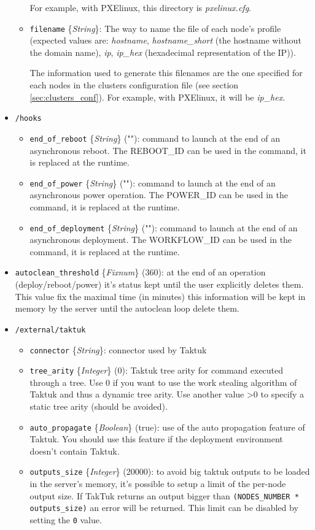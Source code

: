 \documentclass[a4wide,10pt,oneside]{book}
\newcommand{\ypath}[1]{\texttt{#1}}
\newcommand{\yfield}[2]{\texttt{#1} {\small\{{\emph{#2}}\}}:}
\newcommand{\yfieldd}[3]{\texttt{#1} {\small\{{\emph{#2}}\}} {\small(}#3{\small)}:}
\begin{document}
\begin{itemize}
\begin{itemize}
For example, with PXElinux, this directory is \emph{pxelinux.cfg}.
    \item \yfield{filename}{String} The way to name the file of each node's profile (expected values are: \emph{hostname}, \emph{hostname\_short} (the hostname without the domain name), \emph{ip}, \emph{ip\_hex} (hexadecimal representation of the IP)).

The information used to generate this filenames are the one specified for each nodes in the clusters configuration file (see section \ref{sec:clusters_conf}). For example, with PXElinux, it will be \emph{ip\_hex}.
  \end{itemize}

  \item \ypath{/hooks}
  \begin{itemize}
    \item \yfieldd{end\_of\_reboot}{String}{""} command to launch at the end of an asynchronous reboot. The REBOOT\_ID can be used in the command, it is replaced at the runtime.
    \item \yfieldd{end\_of\_power}{String}{""} command to launch at the end of an asynchronous power operation. The POWER\_ID can be used in the command, it is replaced at the runtime.
    \item \yfieldd{end\_of\_deployment}{String}{""} command to launch at the end of an asynchronous deployment. The WORKFLOW\_ID can be used in the command, it is replaced at the runtime.
  \end{itemize}

  \item \yfieldd{autoclean\_threshold}{Fixnum}{360} at the end of an operation (deploy/reboot/power) it's status kept until the user explicitly deletes them. This value fix the maximal time (in minutes) this information will be kept in memory by the server until the autoclean loop delete them.

  \item \ypath{/external/taktuk}
  \begin{itemize}
    \item \yfield{connector}{String} connector used by Taktuk
    \item \yfieldd{tree\_arity}{Integer}{0} Taktuk tree arity for command executed through a tree. Use 0 if you want to use the work stealing algorithm of Taktuk and thus a dynamic tree arity. Use another value >0 to specify a static tree arity (should be avoided).
    \item \yfieldd{auto\_propagate}{Boolean}{true} use of the auto propagation feature of Taktuk. You should use this feature if the deployment environment doesn't contain Taktuk.
    \item \yfieldd{outputs\_size}{Integer}{20000} to avoid big taktuk outputs to be loaded in the server's memory, it's possible to setup a limit of the per-node output size. If TakTuk returns an output bigger than \texttt{(NODES\_NUMBER * outputs\_size)} an error will be returned. This limit can be disabled by setting the \texttt{0} value.
  \end{itemize}


\end{itemize}
\end{document}
